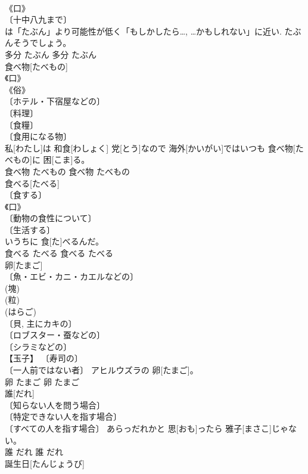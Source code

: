 \documentclass[8pt]{extreport}
\begin{document}
\begin{CJK}{UTF8}{min}
\\	《口》 
\\	〔十中八九まで〕 
\\	は「たぶん」より可能性が低く「もしかしたら…, …かもしれない」に近い.	たぶんそうでしょう。	
\\	多分	たぶん	多分	たぶん	
\\	食べ物[たべもの]	
\\	《口》 
\\	《俗》 
\\	〔ホテル・下宿屋などの〕 
\\	〔料理〕 
\\	〔食糧〕 
\\	〔食用になる物〕 
\\	[＝しょくもつ]	私[わたし]は 和食[わしょく] 党[とう]なので 海外[かいがい]ではいつも 食べ物[たべもの]に 困[こま]る。	
\\	食べ物	たべもの	食べ物	たべもの	
\\	食べる[たべる]	
\\	〔食する〕 
\\	《口》 
\\	〔動物の食性について〕 
\\	〔生活する〕 
\\	[⇒くう２ 
\\	くわせる 
\\	それはバターをつけて 熱[あつ]いうちに 食[た]べるんだ。	
\\	食べる	たべる	食べる	たべる	
\\	卵[たまご]	
\\	〔魚・エビ・カニ・カエルなどの〕 
\\	(塊) 
\\	(粒) 
\\	(はらご) 
\\	〔貝, 主にカキの〕 
\\	〔ロブスター・蚕などの〕 
\\	〔シラミなどの〕 
\\	【玉子】 〔寿司の〕 
\\	〔一人前ではない者〕	アヒル{ウズラ}の 卵[たまご]。	
\\	卵	たまご	卵	たまご	
\\	誰[だれ]	
\\	〔知らない人を問う場合〕 
\\	〔特定できない人を指す場合〕 
\\	〔すべての人を指す場合〕	あらっだれかと 思[おも]ったら 雅子[まさこ]じゃない。	
\\	誰	だれ	誰	だれ	
\\	誕生日[たんじょうび]	

\end{CJK}
\end{document}
